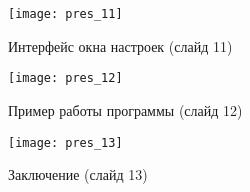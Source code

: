 \begin{figure}[ht!]\centering
	\texttt{[image: pres\_11]}
	\caption{Интерфейс окна настроек (слайд 11)}
\end{figure}

\begin{figure}[ht!]\centering
	\texttt{[image: pres\_12]}
	\caption{Пример работы программы (слайд 12)}
\end{figure}

\begin{figure}[ht!]\centering
	\texttt{[image: pres\_13]}
	\caption{Заключение (слайд 13)}
\end{figure}


